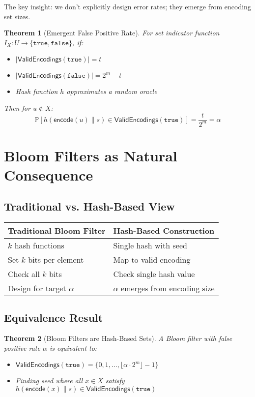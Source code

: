 \documentclass[11pt,final,hidelinks]{article}
\newtheorem{theorem}{Theorem}[section]
\newcommand{\Encode}[1]{\mathsf{encode}(#1)}
\newcommand{\ValidEnc}[1]{\mathsf{ValidEncodings}(#1)}
\newcommand{\Hash}[1]{h(#1)}
\newcommand{\Prob}[1]{\mathbb{P}[#1]}
\newcommand{\Card}[1]{|#1|}
\newcommand{\True}{\mathtt{true}}
\newcommand{\False}{\mathtt{false}}
\newcommand{\fprate}{\alpha}
\begin{document}
The key insight: we don't explicitly design error rates; they emerge from encoding set sizes.

\begin{theorem}[Emergent False Positive Rate]
For set indicator function $I_X: U \to \{\True, \False\}$, if:
\begin{itemize}
    \item $\Card{\ValidEnc{\True}} = t$
    \item $\Card{\ValidEnc{\False}} = 2^m - t$
    \item Hash function $h$ approximates a random oracle
\end{itemize}
Then for $u \notin X$:
\begin{equation}
\Prob{\Hash{\Encode{u} \| s} \in \ValidEnc{\True}} = \frac{t}{2^m} = \fprate
\end{equation}
\end{theorem}

\section{Bloom Filters as Natural Consequence}

\subsection{Traditional vs. Hash-Based View}

\begin{center}
\begin{tabular}{ll}
\textbf{Traditional Bloom Filter} & \textbf{Hash-Based Construction} \\
\hline
$k$ hash functions & Single hash with seed \\
Set $k$ bits per element & Map to valid encoding \\
Check all $k$ bits & Check single hash value \\
Design for target $\fprate$ & $\fprate$ emerges from encoding size \\
\end{tabular}
\end{center}

\subsection{Equivalence Result}

\begin{theorem}[Bloom Filters are Hash-Based Sets]
A Bloom filter with false positive rate $\fprate$ is equivalent to:
\begin{itemize}
    \item $\ValidEnc{\True} = \{0, 1, \ldots, \lfloor\fprate \cdot 2^m\rfloor - 1\}$
    \item Finding seed where all $x \in X$ satisfy $\Hash{\Encode{x} \| s} \in \ValidEnc{\True}$
\end{itemize}
\end{theorem}
\end{document}
